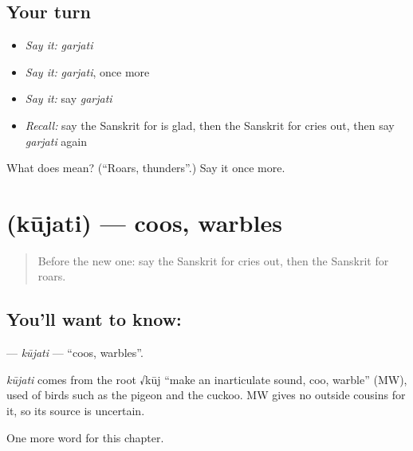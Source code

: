 \subsection*{Your turn}
\begin{itemize}
\raggedright
  \item \emph{Say it:} \emph{garjati}
  \item \emph{Say it:} \emph{garjati}, once more
  \item \emph{Say it:} say \emph{garjati}
  \item \emph{Recall:} say the Sanskrit for is glad, then the Sanskrit for cries out, then say \emph{garjati} again
\end{itemize}

\begin{tcolorbox}[breakable,colback=teal!4,colframe=teal!35!black,title={Before you move on}]
What does  mean? (\textquotedblleft{}Roars, thunders\textquotedblright{}.) Say it once more.
\end{tcolorbox}
\section[\texorpdfstring{\sk{कूजति} (kūjati)}{कूजति (kūjati)}]{ (kūjati) — coos, warbles}

\label{lesson:SA-C145-kujati}



\begin{quote}
Before the new one: say the Sanskrit for cries out, then the Sanskrit for roars.
\end{quote}

\subsection*{You'll want to know: }
\textbf{} — \emph{kūjati} — \textquotedblleft{}coos, warbles\textquotedblright{}.

\begin{cousinweb}
\emph{kūjati} comes from the root √kūj \textquotedblleft{}make an inarticulate sound, coo, warble\textquotedblright{} (MW), used of birds such as the pigeon and the cuckoo. MW gives no outside cousins for it, so its source is uncertain.
\end{cousinweb}

\begin{grammarlens}[title={What you've built}]
One more word for this chapter.
\end{grammarlens}

